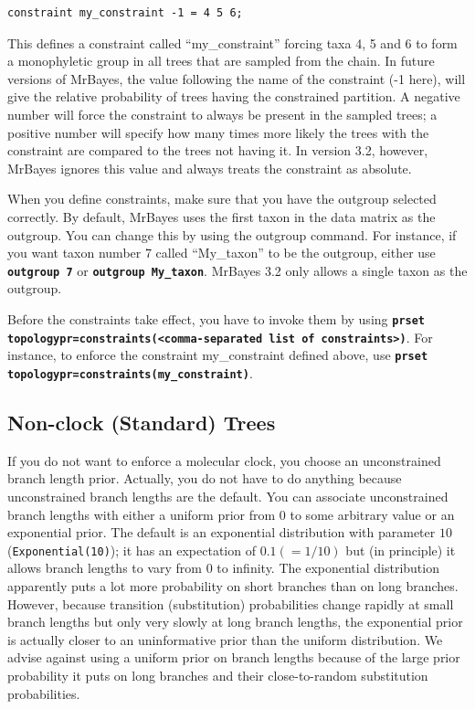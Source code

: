 \documentclass[12pt]{book}
\newcommand{\ttt}[1]{\texttt{#1}}
\newcommand{\tb}[1]{\ttt{\textbf{#1}}}
\begin{document}
\begin{singlespacing}
\footnotesize
\begin{verbatim}
constraint my_constraint -1 = 4 5 6;
\end{verbatim}
\normalsize
\end{singlespacing}

This defines a constraint called ``my\_constraint'' forcing taxa 4, 5 and 6 to form a monophyletic
group in all trees that are sampled from the chain. In future versions of MrBayes, the value
following the name of the constraint (-1 here), will give the relative probability of trees having
the constrained partition. A negative number will force the constraint to always be present in the
sampled trees; a positive number will specify how many times more likely the trees with the
constraint are compared to the trees not having it. In version 3.2, however, MrBayes ignores this
value and always treats the constraint as absolute.

When you define constraints, make sure that you have the outgroup selected correctly. By default,
MrBayes uses the first taxon in the data matrix as the outgroup. You can change this by using the
outgroup command. For instance, if you want taxon number 7 called ``My\_taxon'' to be the outgroup,
either use \tb{outgroup 7} or \tb{outgroup My\_taxon}. MrBayes 3.2 only allows a single taxon as
the outgroup.

Before the constraints take effect, you have to invoke them by using \tb{prset
topologypr=constraints(<comma-separated list of constraints>)}. For instance, to enforce the
constraint my\_constraint defined above, use \tb{prset topologypr=constraints(my\_constraint)}.

\subsection{Non-clock (Standard) Trees}

If you do not want to enforce a molecular clock, you choose an unconstrained branch length prior.
Actually, you do not have to do anything because unconstrained branch lengths are the default. You
can associate unconstrained branch lengths with either a uniform prior from 0 to some arbitrary
value or an exponential prior. The default is an exponential distribution with parameter $10$
(\ttt{Exponential(10)}); it has an expectation of $0.1 (= 1/10)$ but (in principle) it allows
branch lengths to vary from $0$ to infinity. The exponential distribution apparently puts a lot
more probability on short branches than on long branches. However, because transition
(substitution) probabilities change rapidly at small branch lengths but only very slowly at long
branch lengths, the exponential prior is actually closer to an uninformative prior than the uniform
distribution.  We advise against using a uniform prior on branch lengths because of the large prior
probability it puts on long branches and their close-to-random substitution probabilities.
\end{document}
